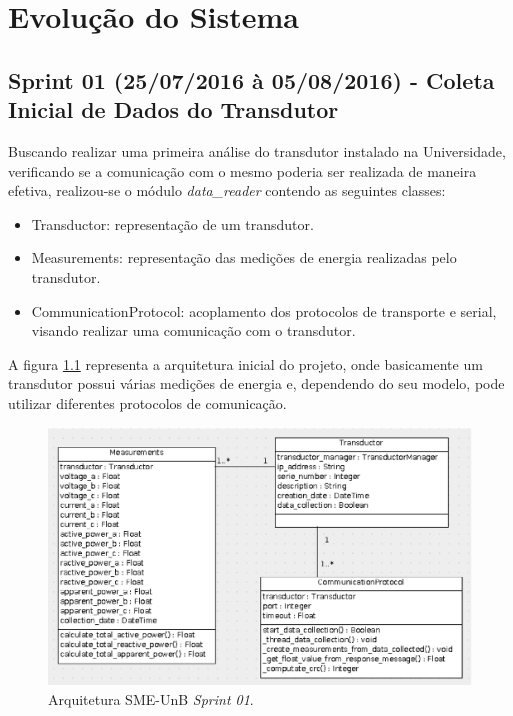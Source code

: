 \chapter{Evolução do Sistema}

\section{Sprint 01 (25/07/2016 à 05/08/2016) - Coleta Inicial de Dados do Transdutor}
Buscando realizar uma primeira análise do transdutor instalado na Universidade, verificando se a comunicação com o mesmo poderia ser realizada de maneira efetiva, realizou-se o módulo \textit{data\_reader} contendo as seguintes classes:
\begin{itemize}
    \item Transductor: representação de um transdutor.
    \item Measurements: representação das medições de energia realizadas pelo transdutor.
    \item CommunicationProtocol: acoplamento dos protocolos de transporte e serial, visando realizar uma comunicação com o transdutor.
\end{itemize}

A figura \ref{sprint01arq} representa a arquitetura inicial do projeto, onde basicamente um transdutor possui várias medições de energia e, dependendo do seu modelo, pode utilizar diferentes protocolos de comunicação.

\begin{figure}[!htpb]
    \centering
    \includegraphics[keepaspectratio=true,scale=0.6]{figuras/sprint01arq.eps}
    \caption{Arquitetura SME-UnB \textit{Sprint 01}. }
    \label{sprint01arq}
\end{figure}

